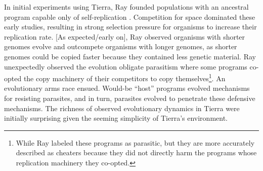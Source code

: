 In initial experiments using Tierra, Ray founded populations with an ancestral program capable only of self-replication \citep{ray_approach_1991}.
Competition for space dominated these early studies, resulting in strong selection pressure for organisms to increase their replication rate. 
[As expected/early on], Ray observed organisms with shorter genomes evolve and outcompete organisms with longer genomes, as shorter genomes could be copied faster because they contained less genetic material.
Ray unexpectedly observed the evolution obligate parasitism where some programs co-opted the copy machinery of their competitors to copy themselves\footnote{While Ray labeled these programs as parasitic, but they are more accurately described as cheaters because they did not directly harm the programs whose replication machinery they co-opted.}. 
An evolutionary arms race ensued.
Would-be ``host'' programs evolved mechanisms for resisting parasites, and in turn, parasites evolved to penetrate these defensive mechanisms.
The richness of observed evolutionary dynamics in Tierra were initially surprising given the seeming simplicity of Tierra's environment. 


